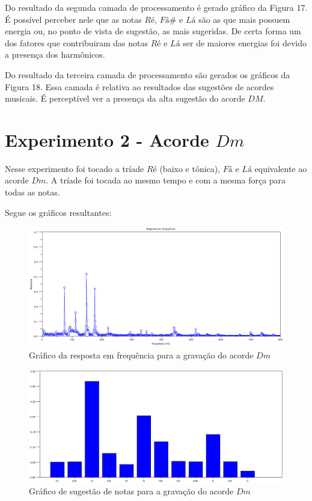 Do resultado da segunda camada de processamento é gerado gráfico da Figura 17. É possível perceber nele que as notas $Ré$, $Fá\#$ e $Lá$ são as que mais possuem energia ou, no ponto de vista de sugestão, as mais sugeridas. De certa forma um dos fatores que contribuiram das notas $Ré$ e $Lá$ ser de maiores energias foi devido a presença dos harmônicos.

Do resultado da terceira camada de processamento são gerados os gráficos da Figura 18. Essa camada é relativa ao resultados das sugestões de acordes musicais. É perceptível ver a presença da alta sugestão do acorde $DM$.
\section{Experimento 2 - Acorde $Dm$}
\label{sec:experimento2}

Nesse experimento foi tocado a tríade $Ré$ (baixo e tônica), $Fá$ e $Lá$ equivalente ao acorde $Dm$. A tríade foi tocada ao mesmo tempo e com a mesma força para todas as notas.

Segue os gráficos resultantes:

\begin{figure}[h]
	\centering
		\includegraphics[keepaspectratio=true,scale=0.49]{figuras/Dm/fft_Dm.eps}
	\caption{Gráfico da resposta em frequência para a gravação do acorde $Dm$}
\end{figure}

\begin{figure}[h]
	\centering
		\includegraphics[keepaspectratio=true,scale=0.49]{figuras/Dm/notas_Dm.eps}
	\caption{Gráfico de sugestão de notas para a gravação do acorde $Dm$}
\end{figure}

